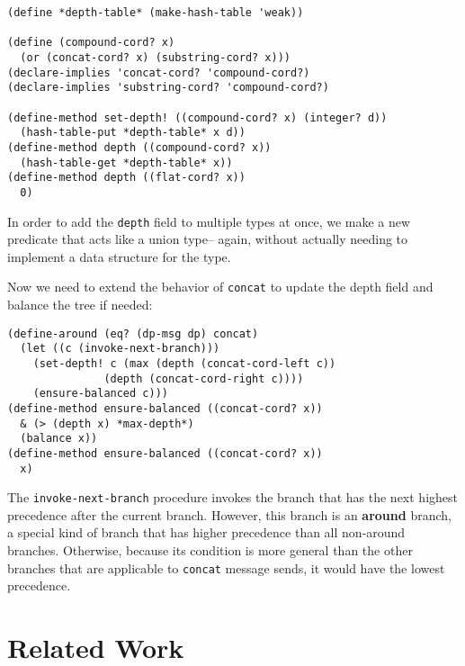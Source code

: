 \documentclass{article}
\newcommand{\defn}[1]{\textbf{#1}}
\newcommand{\code}[1]{\texttt{#1}}
\begin{document}
\begin{verbatim}
(define *depth-table* (make-hash-table 'weak))

(define (compound-cord? x)
  (or (concat-cord? x) (substring-cord? x)))
(declare-implies 'concat-cord? 'compound-cord?)
(declare-implies 'substring-cord? 'compound-cord?)

(define-method set-depth! ((compound-cord? x) (integer? d))
  (hash-table-put *depth-table* x d))
(define-method depth ((compound-cord? x))
  (hash-table-get *depth-table* x))
(define-method depth ((flat-cord? x))
  0)
\end{verbatim}

In order to add the \code{depth} field to multiple types at once, we
make a new predicate that acts like a union type-- again, without
actually needing to implement a data structure for the type.

Now we need to extend the behavior of \code{concat} to update the
depth field and balance the tree if needed:

\begin{verbatim}
(define-around (eq? (dp-msg dp) concat)
  (let ((c (invoke-next-branch)))
    (set-depth! c (max (depth (concat-cord-left c))
		       (depth (concat-cord-right c))))
    (ensure-balanced c)))
(define-method ensure-balanced ((concat-cord? x))
  & (> (depth x) *max-depth*)
  (balance x))
(define-method ensure-balanced ((concat-cord? x))
  x)
\end{verbatim}

The \code{invoke-next-branch} procedure invokes the branch that has
the next highest precedence after the current branch.  However, this
branch is an \defn{around} branch, a special kind of branch that has
higher precedence than all non-around branches.  Otherwise, because
its condition is more general than the other branches that are
applicable to \code{concat} message sends, it would have the lowest
precedence.  



\section{Related Work}
\label{section:related-work}
\end{document}
